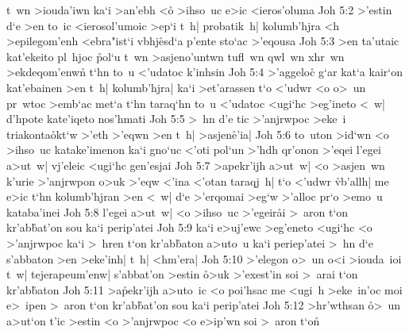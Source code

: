 t~wn
>iouda'iwn
ka`i
>an'ebh
<o\r{}
>ihso~uc
e>ic
<ieros'oluma\bibvsend
\vs Joh 5:2
>'estin
d`e
>en
to~ic
<ierosol'umoic
>ep`i
t~h|
probatik~h|
kolumb'hjra
<h
>epilegom'enh
<ebra"ist`i
vbhj\r{e}sd`a
p'ente
sto`ac
>'eqousa\bibvsend
\vs Joh 5:3
>en
ta'utaic
kat'ekeito
pl~hjoc
\r{p}ol`u
t~wn
>asjeno'untwn
tufl~wn
qwl~wn
xhr~wn
>ekdeqom'enwn\r{}
t`hn
to~u
<'udatoc
k'inhsin\bibvsend
\vs Joh 5:4
>'aggeloc\r{}
g`ar
kat`a
kair`on
kat'ebainen
>en
t~h|
kolumb'hjra|
ka`i
>et'arassen
t`o
<'udwr
<o
o>~un
pr~wtoc
>emb`ac
met`a
t`hn
taraq`hn
to~u
<'udatoc
<ugi`hc
>eg'ineto
<~w|
d'hpote
kate'iqeto
nos'hmati\bibvsend
\vs Joh 5:5
>~hn
d'e
tic
>'anjrwpoc
>eke~i
triakonta\r{o}kt`w
>'eth
>'eqwn
>en
t~h|
>asjen\r{e}'ia|\bibvsend
{}
\vs Joh 5:6
to~uton
>id`wn
<o
>ihso~uc
katake'imenon
ka`i
gno`uc
<'oti
pol`un
>'hdh
qr'onon
>'eqei
l'egei
a>ut~w|
vj'eleic
<ugi`hc
gen'esjai\bibvsend
\vs Joh 5:7
>apekr'ijh
a>ut~w|
<o
>asjen~wn
k'urie
>'anjrwpon
o>uk
>'eqw
<'ina
<'otan
taraqj~h|
t`o
<'udwr
\r{vb}'allh|
me
e>ic
t`hn
kolumb'hjran
>en
<~w|
d`e
>'erqomai
>eg`w
>'alloc
pr`o
>emo~u
kataba'inei\bibvsend
\vs Joh 5:8
l'egei
a>ut~w|
<o
>ihso~uc
>'egeir\r{a}i
>~aron
t`on
kr'ab\r{b}at'on
sou
ka`i
perip'atei\bibvsend
\vs Joh 5:9
ka`i
e>uj'ewc
>eg'eneto
<ugi`hc
<o
>'anjrwpoc
ka`i
>~hren
t`on
kr'ab\r{b}aton
a>uto~u
ka`i
periep'atei
>~hn
d`e
s'abbaton
>en
>eke'inh|
t~h|
<hm'era|\bibvsend
\vs Joh 5:10
>'elegon
o>~un
o<i
>iouda~ioi
t~w|
tejerapeum'enw|
s'abbat'on
>estin
\r{o}>uk
>'exest'in
soi
>~arai
t`on
kr'ab\r{b}aton\bibvsend
{}
\vs Joh 5:11
>a\r{p}ekr'ijh
a>uto~ic
<o
poi'hsac
me
<ugi~h
>eke~in'oc
moi
e>~ipen
>~aron
t`on
kr'ab\r{b}at'on
sou
ka`i
perip'atei\bibvsend
\vs Joh 5:12
>hr'wthsan
\r{o}>~un
a>ut`on
t'ic
>estin
<o
>'anjrwpoc
<o
e>ip'wn
soi
>~aron
t`on\r{}
